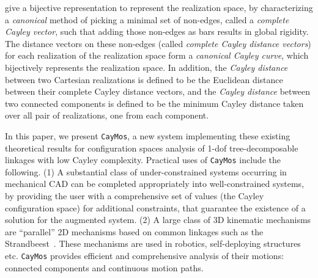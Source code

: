 \documentclass[prodmode,acmtoms]{acmsmall}
\begin{document}
 give a bijective representation to represent the realization space, 
by characterizing a \emph{canonical} method of picking a minimal set of non-edges, called a \emph{complete Cayley vector}, such that adding those non-edges as bars results in global rigidity.
The distance vectors on these non-edges (called \emph{complete Cayley distance vectors}) for each realization of the realization space form a \emph{canonical Cayley curve}, which bijectively represents the realization space.
In addition, the \emph{Cayley distance} between two Cartesian realizations is defined to be the Euclidean distance between their complete Cayley distance vectors,
and the \emph{Cayley distance} between two connected components is defined to be the minimum Cayley distance taken over all pair of realizations, one from each component. 







In this paper, 
we present \texttt{CayMos}, a new system implementing these existing theoretical results
for configuration spaces analysis of 1-dof tree-decomposable linkages with low Cayley complexity.
%
Practical uses of \texttt{CayMos} include the following. 
(1) A substantial class of under-constrained systems occurring in mechanical CAD %
 can be completed appropriately into
well-constrained systems, by providing the user with a comprehensive set of values (the Cayley configuration space) for additional constraints, that guarantee the existence of a solution for the augmented system. 
%
(2) A large class of 3D kinematic mechanisms are ``parallel'' 2D mechanisms based on common linkages 
such as the Strandbeest~\cite{jansen2009strandbeest}.
These mechanisms are used in robotics, self-deploying structures etc.
\texttt{CayMos} provides efficient and comprehensive analysis of their motions: connected components and continuous motion paths. 
\end{document}
